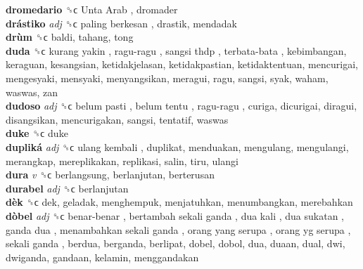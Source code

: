 \textbf{dromedario} ␝ϲ   Unta Arab , dromader  \\
\textbf{drástiko} \emph{adj}  ␝ϲ   paling berkesan , drastik, mendadak  \\
\textbf{drùm} ␝ϲ  baldi, tahang, tong  \\
\textbf{duda} ␝ϲ   kurang yakin ,  ragu-ragu ,  sangsi thdp ,  terbata-bata , kebimbangan, keraguan, kesangsian, ketidakjelasan, ketidakpastian, ketidaktentuan, mencurigai, mengesyaki, mensyaki, menyangsikan, meragui, ragu, sangsi, syak, waham, waswas, zan  \\
\textbf{dudoso} \emph{adj}  ␝ϲ   belum pasti ,  belum tentu ,  ragu-ragu , curiga, dicurigai, diragui, disangsikan, mencurigakan, sangsi, tentatif, waswas  \\
\textbf{duke} ␝ϲ  duke  \\
\textbf{dupliká} \emph{adj}  ␝ϲ   ulang kembali , duplikat, menduakan, mengulang, mengulangi, merangkap, mereplikakan, replikasi, salin, tiru, ulangi  \\
\textbf{dura} \emph{v}  ␝ϲ  berlangsung, berlanjutan, berterusan  \\
\textbf{durabel} \emph{adj}  ␝ϲ  berlanjutan  \\
\textbf{dèk} ␝ϲ  dek, geladak, menghempuk, menjatuhkan, menumbangkan, merebahkan  \\
\textbf{dòbel} \emph{adj}  ␝ϲ   benar-benar ,  bertambah sekali ganda ,  dua kali ,  dua sukatan ,  ganda dua ,  menambahkan sekali ganda ,  orang yang serupa ,  orang yg serupa ,  sekali ganda , berdua, berganda, berlipat, dobel, dobol, dua, duaan, dual, dwi, dwiganda, gandaan, kelamin, menggandakan  \\
